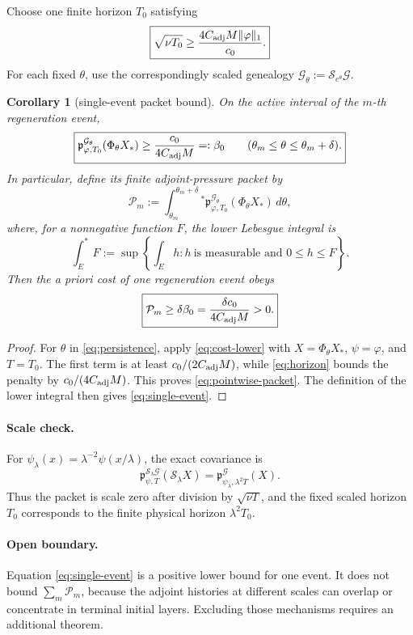 \documentclass[11pt]{article}
\newcommand{\cG}{\mathcal G}
\newcommand{\cS}{\mathcal S}
\newtheorem{corollary}{Corollary}
\begin{document}
Choose one finite horizon \(T_0\) satisfying
\begin{equation}
  \boxed{
  \sqrt{\nu T_0}
  \ge
  \frac{4C_{\rm adj}M\|\varphi\|_1}{c_0}.}
  \label{eq:horizon}
\end{equation}
For each fixed \(\theta\), use the correspondingly scaled genealogy
\(\cG_\theta:=\cS_{e^\theta}\cG\).

\begin{corollary}[single-event packet bound]
\label{cor:single-event}
On the active interval of the \(m\)-th regeneration event,
\begin{equation}
  \boxed{
  \mathfrak p^{\cG_\theta}_{\varphi,T_0}
    (\Phi_\theta X_*)
  \ge
  \frac{c_0}{4C_{\rm adj}M}
  =:\beta_0
  \qquad
  (\theta_m\le\theta\le\theta_m+\delta).}
  \label{eq:pointwise-packet}
\end{equation}
In particular, define its finite adjoint-pressure packet by
\begin{equation}
  \boxed{
  \mathcal P_m
  :=
  \int_{\theta_m}^{\theta_m+\delta}{}^{\!*}
  \mathfrak p^{\cG_\theta}_{\varphi,T_0}
    (\Phi_\theta X_*)\,d\theta,}
  \label{eq:packet}
\end{equation}
where, for a nonnegative function \(F\), the lower Lebesgue integral is
\[
  \int_E^{\!*}F
  :=
  \sup\left\{
    \int_E h:
    h\ \text{is measurable and }0\le h\le F
  \right\}.
\]
Then the a priori cost of one regeneration event obeys
\begin{equation}
  \boxed{
  \mathcal P_m
  \ge
  \delta\beta_0
  =
  \frac{\delta c_0}{4C_{\rm adj}M}
  >0.}
  \label{eq:single-event}
\end{equation}
\end{corollary}

\begin{proof}
For \(\theta\) in \eqref{eq:persistence}, apply
\eqref{eq:cost-lower} with \(X=\Phi_\theta X_*\),
\(\psi=\varphi\), and \(T=T_0\).  The first term is at least
\(c_0/(2C_{\rm adj}M)\), while \eqref{eq:horizon} bounds the penalty by
\(c_0/(4C_{\rm adj}M)\).  This proves
\eqref{eq:pointwise-packet}.  The definition of the lower integral then
gives \eqref{eq:single-event}.
\end{proof}

\paragraph{Scale check.}
For
\(\psi_\lambda(x)=\lambda^{-2}\psi(x/\lambda)\), the exact covariance is
\[
  \boxed{
  \mathfrak p^{\cS_\lambda\cG}_{\psi,T}
    (\cS_\lambda X)
  =
  \mathfrak p^\cG_{\psi_\lambda,\lambda^2T}(X).}
\]
Thus the packet is scale zero after division by \(\sqrt{\nu T}\), and
the fixed scaled horizon \(T_0\) corresponds to the finite physical
horizon \(\lambda^2T_0\).

\paragraph{Open boundary.}
Equation \eqref{eq:single-event} is a positive lower bound for one event.
It does not bound \(\sum_m\mathcal P_m\), because the adjoint histories
at different scales can overlap or concentrate in terminal initial
layers.  Excluding those mechanisms requires an additional theorem.
\end{document}
